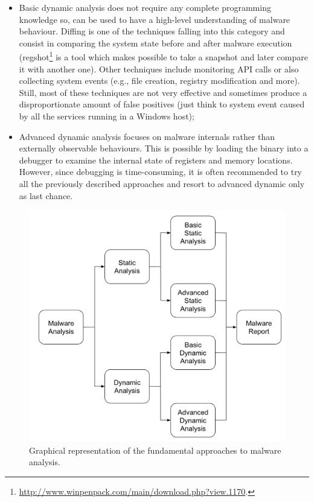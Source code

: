 \documentclass[LaM,binding=0.6cm]{sapthesis}
\begin{document}
\begin{itemize}
\begin{itemize}
\item Basic dynamic analysis does not require any complete programming knowledge so, can be used to have a high-level understanding of malware behaviour. Diffing is one of the techniques falling into this category and consist in comparing the system state before and after malware execution (regshot\footnote{\url{http://www.winpenpack.com/main/download.php?view.1170}.} is a tool which makes possible to take a snapshot and later compare it with another one). Other techniques include monitoring API calls or also collecting system events (e.g., file creation, registry modification and more). Still, most of these techniques are not very effective and sometimes produce a disproportionate amount of false positives (just think to system event caused by all the services running in a Windows host);
\item Advanced dynamic analysis focuses on malware internals rather than externally observable behaviours. This is possible by loading the binary into a debugger to examine the internal state of registers and memory locations. However, since debugging is time-consuming, it is often recommended to try all the previously described approaches and resort to advanced dynamic only as last chance.
\end{itemize}
\end{itemize}

\begin{figure}[h!]
\centering
\includegraphics[scale=.5]{images/background3}
\caption{Graphical representation of the fundamental approaches to malware analysis.}
\end{figure}
\end{document}
